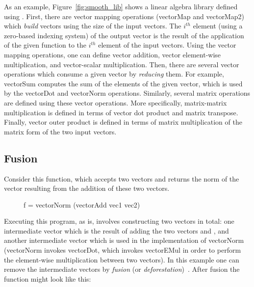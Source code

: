 
As an example, Figure~\ref{fig:smooth_lib} shows a linear algebra library defined using \lafsharp{}. First, there are vector mapping operations (vectorMap and vectorMap2) which \textit{build} vectors using the size of the input vectors. The $i^{th}$ element (using a zero-based indexing system) of the output vector is the result of the application of the given function to the $i^{th}$ element of the input vectors. Using the vector mapping operations, one can define vector addition, vector element-wise multiplication, and vector-scalar multiplication. Then, there are several vector operations which consume a given vector by \textit{reducing} them. For example, vectorSum computes the sum of the elements of the given vector, which is used by the vectorDot and vectorNorm operations. Similarly, several matrix operations are defined using these vector operations. More specifically, matrix-matrix multiplication is defined in terms of vector dot product and matrix transpose. 
Finally, vector outer product is defined in terms of matrix multiplication of the matrix form of the two input vectors.

\subsection{Fusion}
Consider this function, which accepts two vectors and returns the norm of the vector resulting from the addition of these two vectors.

\begin{figure}[H]
\hfill\begin{minipage}{.75\textwidth}\raggedright
f = 
  vectorNorm (vectorAdd vec1 vec2)
\end{minipage}\hfill
\end{figure}
\noindent
Executing this program, as is, involves constructing two vectors in total: one intermediate vector which is the result of adding the two vectors  and , and another intermediate vector which is used in the implementation of vectorNorm (vectorNorm invokes vectorDot, which invokes vectorEMul in order to perform the element-wise multiplication between two vectors). In this 
example one can remove the intermediate vectors by {\em fusion} (or \emph{deforestation})~\cite{deforestation, foldr-fusion-1, Svenningsson:2002:SFA:581478.581491, Coutts07streamfusion}. After fusion the function might look like this:

